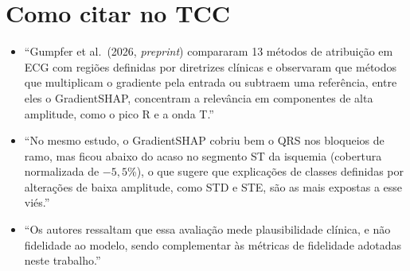 \documentclass[11pt,a4paper]{article}
\begin{document}
\section{Como citar no TCC}
\begin{itemize}
\item “Gumpfer et al.\ (2026, \textit{preprint}) compararam 13 métodos de atribuição em ECG com regiões definidas por diretrizes clínicas e observaram que métodos que multiplicam o gradiente pela entrada ou subtraem uma referência, entre eles o GradientSHAP, concentram a relevância em componentes de alta amplitude, como o pico R e a onda T.”
\item “No mesmo estudo, o GradientSHAP cobriu bem o QRS nos bloqueios de ramo, mas ficou abaixo do acaso no segmento ST da isquemia (cobertura normalizada de $-5{,}5$\%), o que sugere que explicações de classes definidas por alterações de baixa amplitude, como STD e STE, são as mais expostas a esse viés.”
\item “Os autores ressaltam que essa avaliação mede plausibilidade clínica, e não fidelidade ao modelo, sendo complementar às métricas de fidelidade adotadas neste trabalho.”
\end{itemize}
\end{document}
